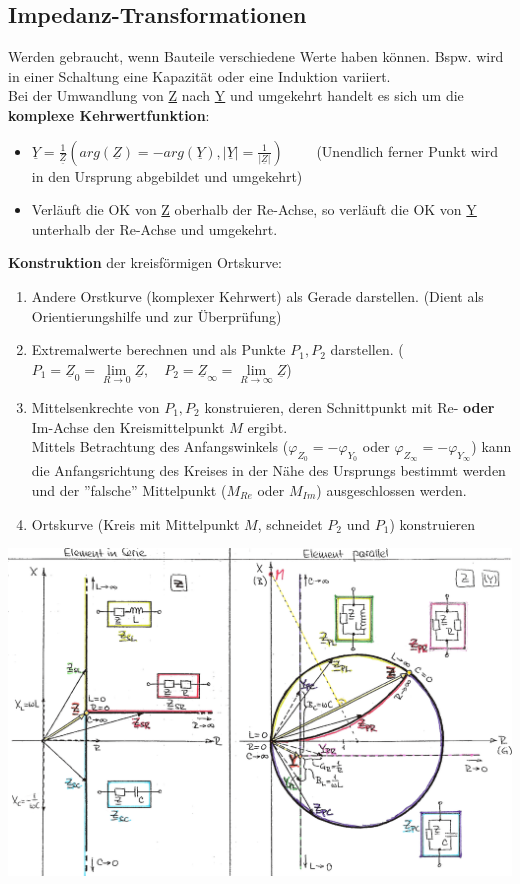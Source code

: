 \subsection{Impedanz-Transformationen}
Werden gebraucht, wenn Bauteile verschiedene Werte haben können. Bspw. wird in
einer Schaltung eine Kapazität oder eine Induktion variiert.\\
Bei der Umwandlung von \underline{Z} nach \underline{Y} und umgekehrt handelt es sich um die
\textbf{komplexe Kehrwertfunktion}: 
\begin{itemize}
  \item $\underline{Y} = \frac{1}{\underline{Z}} 
  ( arg(\underline{Z}) = -arg(\underline{Y}),  
  |\underline{Y}| = \frac{1}{| \underline{Z} |}) \qquad$
  (Unendlich ferner Punkt wird in den Ursprung abgebildet und umgekehrt)
  \item Verläuft die OK von \underline{Z} oberhalb der Re-Achse, so verläuft die OK von
  \underline{Y} unterhalb der Re-Achse und umgekehrt.
\end{itemize} 
\textbf{Konstruktion} der kreisförmigen Ortskurve:
\begin{enumerate}
  \item Andere Orstkurve (komplexer Kehrwert) als Gerade darstellen. (Dient als Orientierungshilfe
  und zur Überprüfung)
  \item Extremalwerte berechnen und als Punkte $P_1, P_2$ darstellen. 
	($P_1 = \underline{Z}_0 = \lim\limits_{R \rightarrow 0}\underline{Z}, \quad
	  P_2 = \underline{Z}_\infty = \lim\limits_{R \rightarrow \infty}\underline{Z} $)
  \item Mittelsenkrechte von $P_1, P_2$ konstruieren, deren Schnittpunkt mit Re- \textbf{oder}
  Im-Achse den Kreismittelpunkt $M$ ergibt. \\
  Mittels Betrachtung des Anfangswinkels ($\varphi_{Z_0} = - \varphi_{Y_0}$  oder
  $\varphi_{Z_\infty} = - \varphi_{Y_\infty}$) kann die Anfangsrichtung des Kreises in
  der Nähe des Ursprungs bestimmt werden und der ''falsche'' Mittelpunkt ($M_{Re}$ oder $M_{Im}$)
  ausgeschlossen werden.
  \item Ortskurve (Kreis mit Mittelpunkt $M$, schneidet $P_2$ und $P_1$) konstruieren
\end{enumerate}

\includegraphics[width=18cm]{./images/impedanztrafo.png}